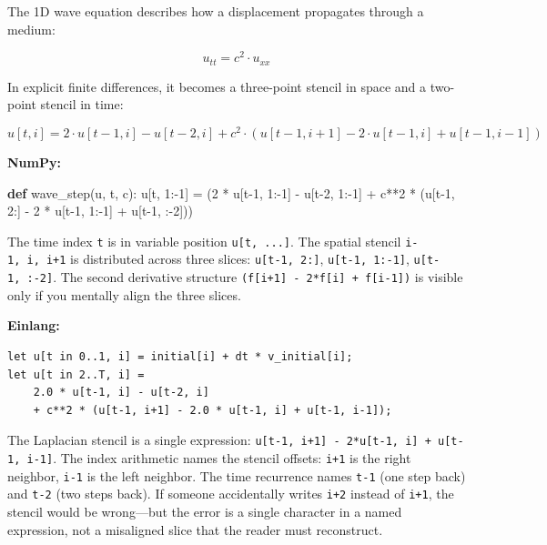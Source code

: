 \documentclass[11pt,titlepage]{article}
\newenvironment{Shaded}{}{}
\newcommand{\DecValTok}[1]{\textcolor[rgb]{0.25,0.63,0.44}{#1}}
\newcommand{\KeywordTok}[1]{\textcolor[rgb]{0.00,0.44,0.13}{\textbf{#1}}}
\newcommand{\NormalTok}[1]{#1}
\newcommand{\OperatorTok}[1]{\textcolor[rgb]{0.40,0.40,0.40}{#1}}
\begin{document}
The 1D wave equation describes how a displacement propagates through a
medium:

\[u_{tt} = c^2 \cdot u_{xx}\]

In explicit finite differences, it becomes a three-point stencil in
space and a two-point stencil in time:

\[u[t, i] = 2 \cdot u[t-1, i] - u[t-2, i] + c^2 \cdot (u[t-1, i+1] - 2 \cdot u[t-1, i] + u[t-1, i-1])\]

\textbf{NumPy:}

\begin{Shaded}
\begin{Highlighting}[]
\KeywordTok{def}\NormalTok{ wave_step(u, t, c):}
\NormalTok{    u[t, }\DecValTok{1}\NormalTok{:}\OperatorTok{-}\DecValTok{1}\NormalTok{] }\OperatorTok{=}\NormalTok{ (}\DecValTok{2} \OperatorTok{*}\NormalTok{ u[t}\DecValTok{-1}\NormalTok{, }\DecValTok{1}\NormalTok{:}\OperatorTok{-}\DecValTok{1}\NormalTok{] }\OperatorTok{-}\NormalTok{ u[t}\DecValTok{-2}\NormalTok{, }\DecValTok{1}\NormalTok{:}\OperatorTok{-}\DecValTok{1}\NormalTok{]}
                   \OperatorTok{+}\NormalTok{ c}\OperatorTok{**}\DecValTok{2} \OperatorTok{*}\NormalTok{ (u[t}\DecValTok{-1}\NormalTok{, }\DecValTok{2}\NormalTok{:] }\OperatorTok{-} \DecValTok{2} \OperatorTok{*}\NormalTok{ u[t}\DecValTok{-1}\NormalTok{, }\DecValTok{1}\NormalTok{:}\OperatorTok{-}\DecValTok{1}\NormalTok{] }\OperatorTok{+}\NormalTok{ u[t}\DecValTok{-1}\NormalTok{, :}\OperatorTok{-}\DecValTok{2}\NormalTok{]))}
\end{Highlighting}
\end{Shaded}

The time index \texttt{t} is in variable position
\texttt{u{[}t,\ ...{]}}. The spatial stencil \texttt{i-1,\ i,\ i+1} is
distributed across three slices: \texttt{u{[}t-1,\ 2:{]}},
\texttt{u{[}t-1,\ 1:-1{]}}, \texttt{u{[}t-1,\ :-2{]}}. The second
derivative structure \texttt{(f{[}i+1{]}\ -\ 2*f{[}i{]}\ +\ f{[}i-1{]})}
is visible only if you mentally align the three slices.

\textbf{Einlang:}

\begin{verbatim}
let u[t in 0..1, i] = initial[i] + dt * v_initial[i];
let u[t in 2..T, i] =
    2.0 * u[t-1, i] - u[t-2, i]
    + c**2 * (u[t-1, i+1] - 2.0 * u[t-1, i] + u[t-1, i-1]);
\end{verbatim}

The Laplacian stencil is a single expression:
\texttt{u{[}t-1,\ i+1{]}\ -\ 2*u{[}t-1,\ i{]}\ +\ u{[}t-1,\ i-1{]}}. The
index arithmetic names the stencil offsets: \texttt{i+1} is the right
neighbor, \texttt{i-1} is the left neighbor. The time recurrence names
\texttt{t-1} (one step back) and \texttt{t-2} (two steps back). If
someone accidentally writes \texttt{i+2} instead of \texttt{i+1}, the
stencil would be wrong---but the error is a single character in a named
expression, not a misaligned slice that the reader must reconstruct.
\end{document}
